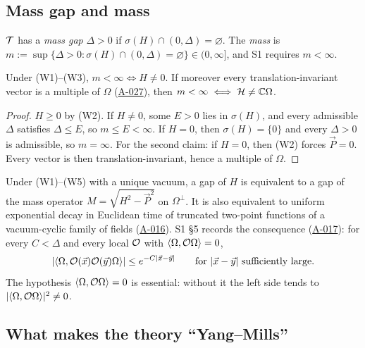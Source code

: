 \documentclass[11pt,a4paper]{article}
\newcommand{\idref}[1]{\hyperref[#1]{\textsf{#1}}}
\begin{document}
\subsection{Mass gap and mass}\label{sec:gap}

\begin{definition}[S1 \S4]\label{def:gap}
$\mathcal T$ has a \emph{mass gap} $\Delta>0$ if $\sigma(H)\cap(0,\Delta)=\varnothing$. The \emph{mass} is $m:=\sup\{\Delta>0:\sigma(H)\cap(0,\Delta)=\varnothing\}\in(0,\infty]$, and S1 requires $m<\infty$.
\end{definition}

\begin{lemma}\label{lem:finite-mass}
Under (W1)--(W3), $m<\infty\iff H\ne0$. If moreover every translation-invariant vector is a multiple of $\Omega$ \textup{(\idref{A-027})}, then $m<\infty\iff\mathcal H\ne\mathbb C\Omega$.
\end{lemma}
\begin{proof}
$H\ge0$ by (W2). If $H\ne0$, some $E>0$ lies in $\sigma(H)$, and every admissible $\Delta$ satisfies $\Delta\le E$, so $m\le E<\infty$. If $H=0$, then $\sigma(H)=\{0\}$ and every $\Delta>0$ is admissible, so $m=\infty$. For the second claim: if $H=0$, then (W2) forces $\vec P=0$. Every vector is then translation-invariant, hence a multiple of $\Omega$.
\end{proof}

\begin{remark}
Under (W1)--(W5) with a unique vacuum, a gap of $H$ is equivalent to a gap of the mass operator $M=\sqrt{H^2-\vec P^2}$ on $\Omega^\perp$. It is also equivalent to uniform exponential decay in Euclidean time of truncated two-point functions of a vacuum-cyclic family of fields (\idref{A-016}). S1 \S5 records the consequence (\idref{A-017}): for every $C<\Delta$ and every local $\mathcal O$ with $\langle\Omega,\mathcal O\Omega\rangle=0$,
\[
|\langle\Omega,\mathcal O(\vec x)\mathcal O(\vec y)\Omega\rangle|\le e^{-C|\vec x-\vec y|}\qquad\text{for }|\vec x-\vec y|\text{ sufficiently large.}
\]
The hypothesis $\langle\Omega,\mathcal O\Omega\rangle=0$ is essential: without it the left side tends to $|\langle\Omega,\mathcal O\Omega\rangle|^2\neq0$.
\end{remark}

\subsection{What makes the theory \enquote{Yang--Mills}}\label{sec:ym-identity}
\end{document}
